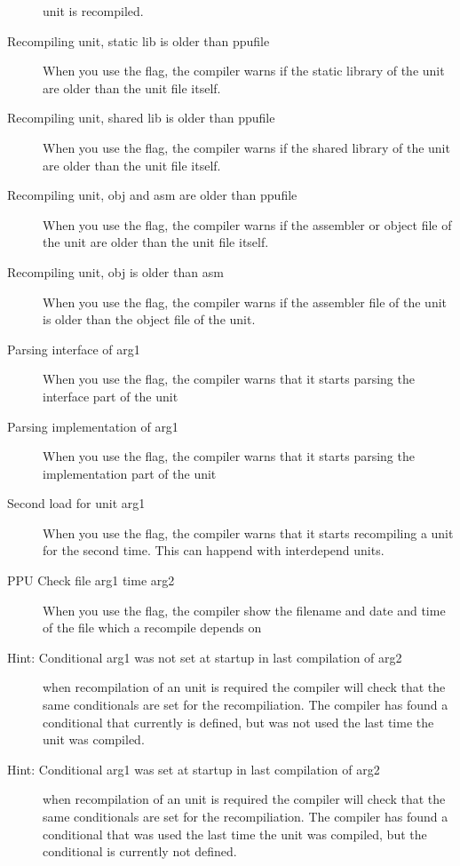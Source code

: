 \begin{description}
 unit is recompiled.
\item [Recompiling unit, static lib is older than ppufile]
 When you use the  flag, the compiler warns if the static library
 of the unit are older than the unit file itself.
\item [Recompiling unit, shared lib is older than ppufile]
 When you use the  flag, the compiler warns if the shared library
 of the unit are older than the unit file itself.
\item [Recompiling unit, obj and asm are older than ppufile]
 When you use the  flag, the compiler warns if the assembler or
 object file of the unit are older than the unit file itself.
\item [Recompiling unit, obj is older than asm]
 When you use the  flag, the compiler warns if the assembler
 file of the unit is older than the object file of the unit.
\item [Parsing interface of arg1]
 When you use the  flag, the compiler warns that it starts
 parsing the interface part of the unit
\item [Parsing implementation of arg1]
 When you use the  flag, the compiler warns that it starts
 parsing the implementation part of the unit
\item [Second load for unit arg1]
 When you use the  flag, the compiler warns that it starts
 recompiling a unit for the second time. This can happend with interdepend
 units.
\item [PPU Check file arg1 time arg2]
 When you use the  flag, the compiler show the filename and
 date and time of the file which a recompile depends on
\item [Hint: Conditional arg1 was not set at startup in last compilation of arg2]
 when recompilation of an unit is required the compiler will check that
 the same conditionals are set for the recompiliation. The compiler has
 found a conditional that currently is defined, but was not used the last
 time the unit was compiled.
\item [Hint: Conditional arg1 was set at startup in last compilation of arg2]
 when recompilation of an unit is required the compiler will check that
 the same conditionals are set for the recompiliation. The compiler has
 found a conditional that was used the last time the unit was compiled, but
 the conditional is currently not defined.
 \end{description}

